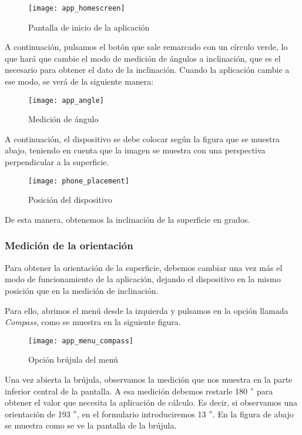 \begin{figure}[H]
\texttt{[image: app\_homescreen]}
\centering
\caption{Pantalla de inicio de la aplicación}
\end{figure}

A continuación, pulsamos el botón que sale remarcado con un círculo verde, lo que hará que cambie el modo de medición de ángulos a inclinación, que es el necesario para obtener el dato de la inclinación. Cuando la aplicación cambie a ese modo, se verá de la siguiente manera:

\begin{figure}[H]
\texttt{[image: app\_angle]}
\centering
\caption{Medición de ángulo}
\end{figure}

A continuación, el dispositivo se debe colocar según la figura que se muestra abajo, teniendo en cuenta que la imagen se muestra con una perspectiva perpendicular a la superficie.
\begin{figure}[H]
\texttt{[image: phone\_placement]}
\centering
\caption{Posición del dispositivo}
\end{figure}

De esta manera, obtenemos la inclinación de la superficie en grados.

\subsubsection{Medición de la orientación}

Para obtener la orientación de la superficie, debemos cambiar una vez más el modo de funcionamiento de la aplicación, dejando el dispositivo en la mismo posición que en la medición de inclinación.

Para ello, abrimos el menú desde la izquierda y pulsamos en la opción llamada \textit{Compass}, como se muestra en la siguiente figura.

\begin{figure}[H]
\texttt{[image: app\_menu\_compass]}
\centering
\caption{Opción brújula del menú}
\end{figure}

Una vez abierta la brújula, observamos la medición que nos muestra en la parte inferior central de la pantalla. A esa medición debemos restarle 180 $\degree$ para obtener el valor que necesita la aplicación de cálculo. Es decir, si observamos una orientación de 193 $\degree$, en el formulario introduciremos 13 $\degree$. En la figura de abajo se muestra como se ve la pantalla de la brújula.

